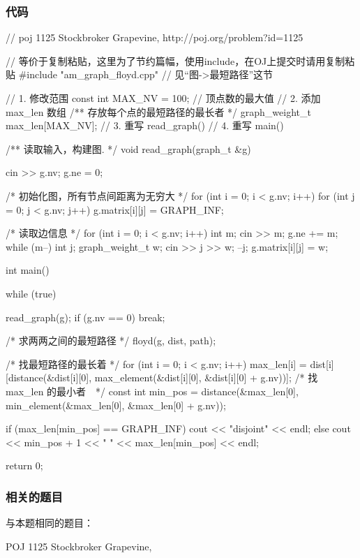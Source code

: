 \subsubsection{代码}
\begin{Codex}[label=poj_1125.cpp]
// poj 1125 Stockbroker Grapevine, http://poj.org/problem?id=1125

// 等价于复制粘贴，这里为了节约篇幅，使用include，在OJ上提交时请用复制粘贴
#include "am_graph_floyd.cpp"  // 见“图->最短路径”这节

// 1. 修改范围
const int MAX_NV = 100; // 顶点数的最大值
// 2. 添加 max_len 数组
/** 存放每个点的最短路径的最长者 */
graph_weight_t max_len[MAX_NV];
// 3. 重写 read_graph()
// 4. 重写 main()

/** 读取输入，构建图. */
void read_graph(graph_t &g) {
    cin >> g.nv;
    g.ne = 0;

    /* 初始化图，所有节点间距离为无穷大 */
    for (int i = 0; i < g.nv; i++) {
        for (int j = 0; j < g.nv; j++) {
            g.matrix[i][j] = GRAPH_INF;
        }
    }

    /* 读取边信息 */
    for (int i = 0; i < g.nv; i++) {
        int m;
        cin >> m;
        g.ne += m;
        while (m--) {
            int j;
            graph_weight_t w;
            cin >> j >> w;
            --j;
            g.matrix[i][j] = w;
        }
    }
}

int main() {
    while (true) {
        read_graph(g);
        if (g.nv == 0) break;

        /* 求两两之间的最短路径 */
        floyd(g, dist, path);

        /* 找最短路径的最长着 */
        for (int i = 0; i < g.nv; i++) {
            max_len[i] = dist[i][distance(&dist[i][0],
                    max_element(&dist[i][0], &dist[i][0] + g.nv))];
        }
        /* 找 max_len 的最小者　*/
        const int min_pos = distance(&max_len[0],
                min_element(&max_len[0], &max_len[0] + g.nv));

        if (max_len[min_pos] == GRAPH_INF) {
            cout << "disjoint" << endl;
        } else {
            cout << min_pos + 1 << " " << max_len[min_pos] << endl;
        }
    }
    return 0;
}
\end{Codex}

\subsubsection{相关的题目}
与本题相同的题目：
\begindot
\item POJ 1125 Stockbroker Grapevine, 
\myenddot

